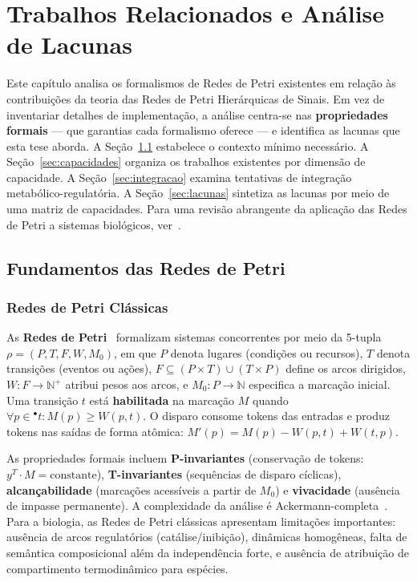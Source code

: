 \chapter{Trabalhos Relacionados e Análise de Lacunas}
\label{ch:fundamentos}

Este capítulo analisa os formalismos de Redes de Petri existentes em relação às
contribuições da teoria das Redes de Petri Hierárquicas de Sinais. Em vez de
inventariar detalhes de implementação, a análise centra-se nas
\textbf{propriedades formais} --- que garantias cada formalismo oferece --- e
identifica as lacunas que esta tese aborda. A Seção~\ref{sec:fundamentos-pn}
estabelece o contexto mínimo necessário. A Seção~\ref{sec:capacidades} organiza
os trabalhos existentes por dimensão de capacidade. A Seção~\ref{sec:integracao}
examina tentativas de integração metabólico-regulatória. A
Seção~\ref{sec:lacunas} sintetiza as lacunas por meio de uma matriz de
capacidades. Para uma revisão abrangente da aplicação das Redes de Petri
a sistemas biológicos, ver~\textcite{Chaouiya2007}.

\section{Fundamentos das Redes de Petri}
\label{sec:fundamentos-pn}

\subsection{Redes de Petri Clássicas}
\label{subsec:pn-classicas}

As \textbf{Redes de Petri}~\cite{Petri1962} formalizam sistemas concorrentes por
meio da 5-tupla $\rho = (P, T, F, W, M_0)$, em que $P$ denota lugares
(condições ou recursos), $T$ denota transições (eventos ou ações),
$F \subseteq (P \times T) \cup (T \times P)$ define os arcos dirigidos,
$W: F \to \mathbb{N}^+$ atribui pesos aos arcos, e $M_0: P \to \mathbb{N}$
especifica a marcação inicial. Uma transição $t$ está \textbf{habilitada} na
marcação $M$ quando $\forall p \in {}^\bullet t: M(p) \geq W(p,t)$. O disparo
consome tokens das entradas e produz tokens nas saídas de forma atômica:
$M'(p) = M(p) - W(p, t) + W(t, p)$.

As propriedades formais incluem \textbf{P-invariantes} (conservação de tokens:
$y^T \cdot M = \text{constante}$), \textbf{T-invariantes} (sequências de disparo
cíclicas), \textbf{alcançabilidade} (marcações acessíveis a partir de $M_0$) e
\textbf{vivacidade} (ausência de impasse permanente). A complexidade da análise
é Ackermann-completa~\cite{Czerwinski2021}. Para a biologia, as Redes de Petri clássicas apresentam
limitações importantes: ausência de arcos regulatórios (catálise/inibição),
dinâmicas homogêneas, falta de semântica composicional além da independência
forte, e ausência de atribuição de compartimento termodinâmico para espécies.


